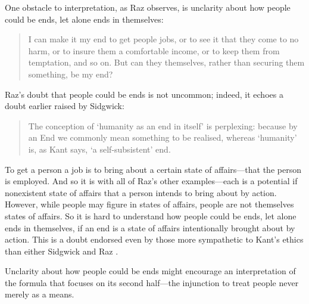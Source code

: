 \documentclass[a4paper,12pt]{article}
\begin{document}
One obstacle to interpretation, as Raz observes, is unclarity about how people could be ends, let alone ends in themselves: 
\begin{quote}
	I can make it my end to get people jobs, or to see it that they come to no harm, or to insure them a comfortable income, or to keep them from temptation, and so on. But can they themselves, rather than securing them something, be my end? \citep[144]{Raz:2001ps} 
\end{quote}
Raz's doubt that people could be ends is not uncommon; indeed, it echoes a doubt earlier raised by Sidgwick:
\begin{quote}
    The conception of `humanity as an end in itself' is perplexing: because by an End we commonly mean something to be realised, whereas `humanity' is, as Kant says, `a self-subsistent' end. \citep[39]{Sidgwick:1981jk}
\end{quote}
To get a person a job is to bring about a certain state of affairs---that the person is employed. And so it is with all of Raz's other examples---each is a potential if nonexistent state of affairs that a person intends to bring about by action. However, while people may figure in states of affairs, people are not themselves states of affairs. So it is hard to understand how people could be ends, let alone ends in themselves, if an end is a state of affairs intentionally brought about by action. This is a doubt endorsed even by those more sympathetic to Kant's ethics than either Sidgwick and Raz \citep[see, for example,][]{Lo:1987xy,Ross:1954jk,Wolff:1973qv}.

Unclarity about how people could be ends might encourage an interpretation of the formula that focuses on its second half---the injunction to treat people never merely as a means.
\end{document}

